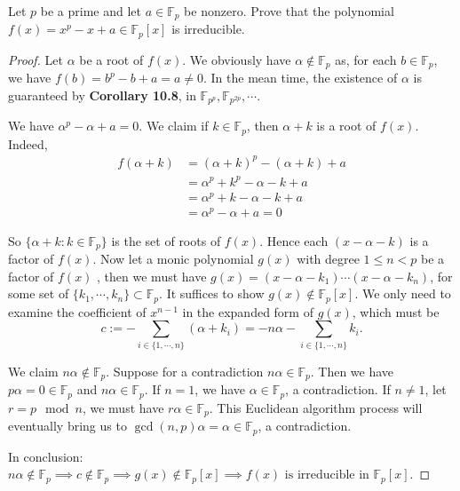 \documentclass[12pt,letterpaper]{article}
\def\F{{\mathbb F}}
\def\prob#1{\vskip13pt\noindent\llap{{\bf #1:\ }}}
\begin{document}
\pagebreak

\prob5 Let $p$ be a prime and let $a\in\F_p$ be nonzero. Prove that the polynomial $f(x) = x^p - x + a\in\F_p[x]$ is irreducible.
\begin{proof}
	Let $\alpha$ be a root of $f(x)$. We obviously have $\alpha\notin \F_p$ as, for each $b\in\F_p$, we have $f(b)=b^p-b+a=a\ne 0$. In the mean time, the existence of $\alpha$ is guaranteed by \textbf{Corollary 10.8}, in $\F_{p^p}, \F_{p^{2p}}, \cdots$.
	
	We have $\alpha^p-\alpha+a=0$. We claim if $k\in \F_p$, then $\alpha+k$ is a root of $f(x)$. Indeed,\begin{align*}
		f(\alpha+k) &= (\alpha+k)^p-(\alpha+k)+a\\
			&=\alpha^p+k^p-\alpha-k+a\\
			&=\alpha^p+k-\alpha-k+a\\
			&=\alpha^p-\alpha+a=0
	\end{align*}

	So $\{\alpha+k: k\in\F_p\}$ is the set of roots of $f(x)$. Hence each $(x-\alpha-k)$ is a factor of $f(x)$. Now let a monic polynomial $g(x)$ with degree $1\le n <p$ be a factor of $f(x)$ , then we must have $g(x)=(x-\alpha-k_1)\cdots(x-\alpha-k_n)$, for some set of $\{k_1,\cdots,k_n\}\subset \F_p$. It suffices to show $g(x)\notin \F_p[x]$. We only need to examine the coefficient of $x^{n-1}$ in the expanded form of $g(x)$, which must be $$c:=\displaystyle -\sum_{i\in\{1,\cdots,n\}}(\alpha+k_i)=-n\alpha-\sum_{i\in\{1,\cdots,n\}}k_i.$$
	
	We claim $n\alpha\notin \F_p$. Suppose for a contradiction $n\alpha\in\F_p$. Then we have $p\alpha=0\in\F_p$ and $n\alpha\in\F_p$. If $n=1$, we have $\alpha\in\F_p$, a contradiction. If $n\ne 1$, let $r=p \mod n$, we must have $r\alpha\in\F_p$. This Euclidean algorithm process will eventually bring us to $\gcd(n,p)\alpha = \alpha\in\F_p$, a contradiction.
	
	In conclusion: $n\alpha\notin \F_p\implies c\notin\F_p\implies g(x)\notin\F_p[x]\implies f(x) \text{ is irreducible in }\F_p[x]$.
\end{proof}
\end{document}
